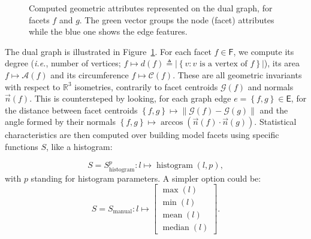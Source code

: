         \begin{figure}[htbp]
            \centering
            
            \caption{
                \label{fig::geometric_features}
                Computed geometric attributes represented on the dual graph, for facets $f$ and $g$.
                The green vector groups the node (facet) attributes while the blue one shows the edge features.
            }
        \end{figure}

        The dual graph is illustrated in Figure~\ref{fig::geometric_features}.
        For each facet $f \in \mathsf{F}$, we compute its degree (\textit{i.e.}, number of vertices; $f \mapsto d\left(f\right) \triangleq \left\lvert\left\{v : v\text{ is a vertex of }f\right\}\right\rvert$), its area $f \mapsto \mathscr{A}\left(f\right)$ and its circumference $f \mapsto \mathscr{C}\left(f\right)$.
        These are all geometric invariants with respect to $\mathbb{R}^3$ isometries, contrarily to facet centroids $\mathscr{G}\left(f\right)$ and normals $\vec{n}\left(f\right)$.
        This is countersteped by looking, for each graph edge $e=\left\{f, g\right\} \in \mathsf{E}$, for the distance between facet centroids $\left\{f, g\right\} \mapsto \left\lVert \mathscr{G}\left(f\right) - \mathscr{G}\left(g\right) \right\rVert$ and the angle formed by their normals $\left\{f, g\right\} \mapsto \arccos\left(\vec{n}\left(f\right) \cdot \vec{n}\left(g\right)\right)$.
        Statistical characteristics are then computed over building model facets using specific functions $S$, like a histogram:        

        \begin{equation}
            \label{eq::histogram_extractor}
        	S = S^p_{\text{histogram}}: l \mapsto \operatorname{histogram}(l, p),
        \end{equation}
        with $p$ standing for histogram parameters. A simpler option could be:
        \begin{equation}
            \label{eq::statistical_extractor}
            S = S_{\text{manual}}: l \mapsto \begin{bmatrix}
                \max(l)\\
                \min(l)\\
                \operatorname{mean}(l)\\
                \operatorname{median}(l)
            \end{bmatrix}.
        \end{equation}

